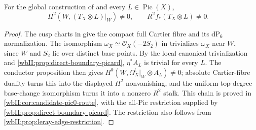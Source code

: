 \begin{corollary}
\hypertarget{tag-03DR}{}\label{wbII:cor:candidate-conductor-actual}

For the global construction of
 and every
$L\in\operatorname{Pic}(X)$,
\[
H^2(W,(T_X\otimes L)|_W)\ne0,
\qquad R^2f_*(T_X\otimes L)\ne0.
\]
\end{corollary}



\begin{proof}
The cusp charts in  give the compact
full Cartier fibre and its $\mathrm{dP}_6$ normalization.  The isomorphism
$\omega_X\simeq\mathcal O_X(-2S_2)$ in
 trivializes $\omega_X$ near $W$, since
$W$ and $S_2$ lie over distinct base points.
By the local canonical trivialization and
\cref{wbII:prop:direct-boundary-picard}, $\eta^*A_L$ is trivial for every $L$.
The conductor proposition then gives
$H^0(W,\Omega_X^1|_W\otimes A_L)\ne0$; absolute Cartier-fibre duality turns
this into the displayed $H^2$ nonvanishing, and the uniform top-degree
base-change isomorphism turns it into a nonzero $R^2$ stalk.  This chain is proved in \cref{wbII:cor:candidate-pic0-route}, with the all-Pic
restriction supplied by \cref{wbII:prop:direct-boundary-picard}.  The restriction also follows from
\cref{wbII:prop:leray-edge-restriction}.

\end{proof}
